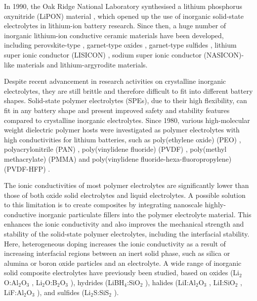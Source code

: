 \documentclass[../main.tex]{subfiles}
\begin{document}
In 1990, the Oak Ridge National Laboratory synthesised a lithium phosphorus oxynitride (LiPON) material \cite{dudney1992,bates1992}, which opened up the use of inorganic solid-state electrolytes in lithium-ion battery research. Since then, a huge number of inorganic lithium-ion conductive ceramic materials have been developed, including perovskite-type \cite{inaguma1993}, garnet-type oxides \cite{kasper1969,mazza1988}, garnet-type sulfides \cite{kennedy1986}, lithium super ionic conductor (LISICON) \cite{ivanov1988}, sodium super ionic conductor (NASICON)-like materials \cite{lang2015} and lithium-argyrodite materials. \cite{de2016}

Despite recent advancement in research activities on crystalline inorganic electrolytes, they are still brittle and therefore difficult to fit into different battery shapes. Solid-state polymer electrolytes (SPEs), due to their high flexibility, can fit in any battery shape and present improved safety and stability features compared to crystalline inorganic electrolytes. \cite{DIRICAN201927} Since 1980, various high-molecular weight dielectric polymer hosts were investigated as polymer electrolytes with high conductivities for lithium batteries, such as poly(ethylene oxide) (PEO) \cite{fenton1973}, polyacrylonitrile (PAN) \cite{abraham1990,dautzenberg1994}, poly(vinylidene fluoride) (PVDF) \cite{arcella1999,kataoka2000,li2016}, poly(methyl methacrylate) (PMMA) \cite{appetecchi1995,bohnke1993} and poly(vinylidene fluoride-hexa-fluoropropylene) (PVDF-HFP) \cite{abbrent2001,park2008,yang2014}.

The ionic conductivities of most polymer electrolytes are significantly lower than those of both oxide solid electrolytes and liquid electrolytes. \cite{zhou2016} A possible solution to this limitation is to create composites by integrating nanoscale highly-conductive inorganic particulate fillers into the polymer electrolyte material. \cite{DIRICAN201927} This enhances the ionic conductivity and also improves the mechanical strength and stability of the solid-state polymer electrolytes, including the interfacial stability. \cite{D0SC03121F} Here, heterogeneous doping increases the ionic conductivity as a result of increasing interfacial regions between an inert solid phase, such as silica or alumina or boron oxide particles and an electrolyte. \cite{uvarov2011} A wide range of inorganic solid composite electrolytes have previously been studied, based on oxides (Li$_{2}$O:Al$_{2}$O$_{3}$ \cite{B300908D}, Li$_{2}$O:B$_{2}$O$_{3}$ \cite{Heitjans_2003,Indris2000,Indris2002}), hydrides (LiBH$_{4}$:SiO$_{2}$ \cite{blanchard2015}), halides (LiI:Al$_{2}$O$_{3}$ \cite{liang1973}, LiI:SiO$_{2}$ \cite{phipps1983}, LiF:Al$_{2}$O$_{3}$ \cite{uvarov1992}), and sulfides (Li$_{2}$S:SiS$_{2}$ \cite{pradel1986}). 
\end{document}
